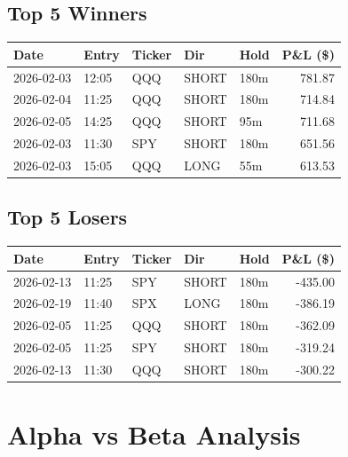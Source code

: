 \documentclass[11pt,a4paper,twoside]{article}
\begin{document}
\subsection{Top 5 Winners}
\noindent\begin{center}
\begin{tabular}{>{\color{txtmain}}l llll r}
\toprule
\rowcolor{cardbg}
\textbf{Date} & \textbf{Entry} & \textbf{Ticker} & \textbf{Dir} & \textbf{Hold} & \textbf{P\&L (\$)} \\
\midrule
2026-02-03 & 12:05 & QQQ & SHORT & 180m & \textcolor{wingreen}{781.87} \\
2026-02-04 & 11:25 & QQQ & SHORT & 180m & \textcolor{wingreen}{714.84} \\
2026-02-05 & 14:25 & QQQ & SHORT & 95m & \textcolor{wingreen}{711.68} \\
2026-02-03 & 11:30 & SPY & SHORT & 180m & \textcolor{wingreen}{651.56} \\
2026-02-03 & 15:05 & QQQ & LONG & 55m & \textcolor{wingreen}{613.53} \\
\bottomrule
\end{tabular}
\end{center}
\subsection{Top 5 Losers}
\noindent\begin{center}
\begin{tabular}{>{\color{txtmain}}l llll r}
\toprule
\rowcolor{cardbg}
\textbf{Date} & \textbf{Entry} & \textbf{Ticker} & \textbf{Dir} & \textbf{Hold} & \textbf{P\&L (\$)} \\
\midrule
2026-02-13 & 11:25 & SPY & SHORT & 180m & \textcolor{lossred}{-435.00} \\
2026-02-19 & 11:40 & SPX & LONG & 180m & \textcolor{lossred}{-386.19} \\
2026-02-05 & 11:25 & QQQ & SHORT & 180m & \textcolor{lossred}{-362.09} \\
2026-02-05 & 11:25 & SPY & SHORT & 180m & \textcolor{lossred}{-319.24} \\
2026-02-13 & 11:30 & QQQ & SHORT & 180m & \textcolor{lossred}{-300.22} \\
\bottomrule
\end{tabular}
\end{center}
\clearpage
\clearpage
\section{Alpha vs Beta Analysis}
\end{document}
